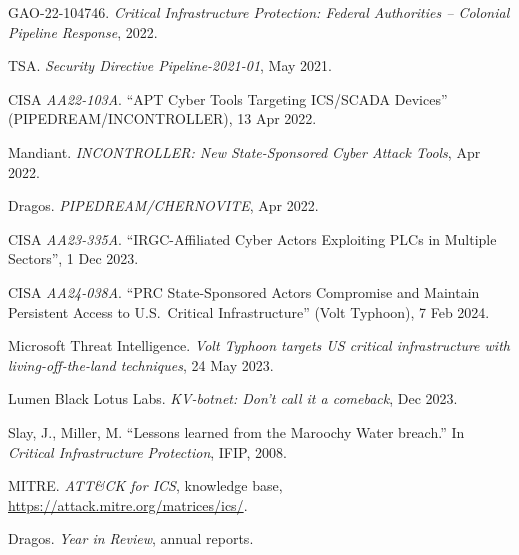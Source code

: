 \documentclass[aspectratio=169,11pt]{beamer}
\begin{document}
{  \item GAO-22-104746. \emph{Critical Infrastructure Protection: Federal Authorities -- Colonial Pipeline Response}, 2022.
  \item TSA. \emph{Security Directive Pipeline-2021-01}, May 2021.
  \item CISA \emph{AA22-103A}. ``APT Cyber Tools Targeting ICS/SCADA Devices'' (PIPEDREAM/INCONTROLLER), 13 Apr 2022.
  \item Mandiant. \emph{INCONTROLLER: New State-Sponsored Cyber Attack Tools}, Apr 2022.
  \item Dragos. \emph{PIPEDREAM/CHERNOVITE}, Apr 2022.
  \item CISA \emph{AA23-335A}. ``IRGC-Affiliated Cyber Actors Exploiting PLCs in Multiple Sectors'', 1 Dec 2023.
  \item CISA \emph{AA24-038A}. ``PRC State-Sponsored Actors Compromise and Maintain Persistent Access to U.S.\ Critical Infrastructure'' (Volt Typhoon), 7 Feb 2024.
  \item Microsoft Threat Intelligence. \emph{Volt Typhoon targets US critical infrastructure with living-off-the-land techniques}, 24 May 2023.
  \item Lumen Black Lotus Labs. \emph{KV-botnet: Don't call it a comeback}, Dec 2023.
  \item Slay, J., Miller, M. ``Lessons learned from the Maroochy Water breach.'' In \emph{Critical Infrastructure Protection}, IFIP, 2008.
  \item MITRE. \emph{ATT\&CK for ICS}, knowledge base, \url{https://attack.mitre.org/matrices/ics/}.
  \item Dragos. \emph{Year in Review}, annual reports.
}

\closingframe
\end{document}
